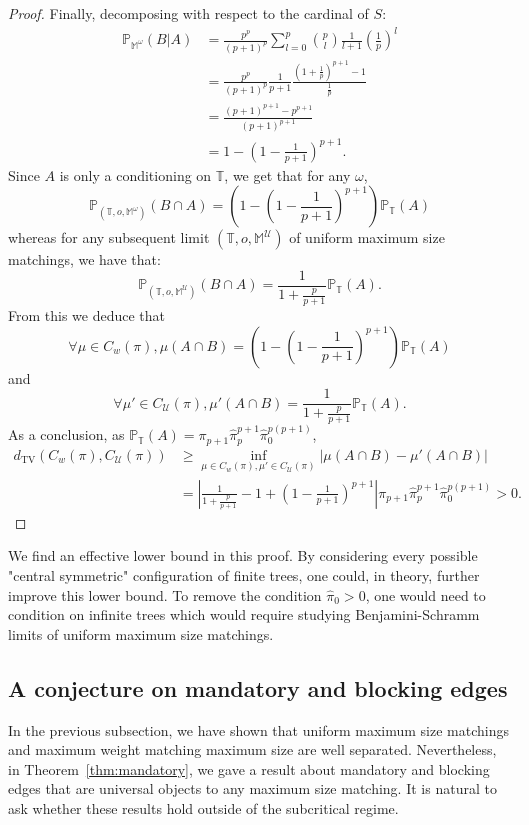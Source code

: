 \documentclass[11pt]{article}
\begin{document}
\begin{proof}
    Finally, decomposing with respect to the cardinal of $S$:
    \begin{align*}
        \mathbb{P}_{\mathbb{M}^{\omega}}(B|A)&= \frac{p^{p}}{(p+1)^{p}}  \sum_{l=0}^{p}  \binom{p}{l}  \frac{1}{l+1} \left(\frac{1}{p}\right)^{l} \\
        &= \frac{p^{p}}{(p+1)^{p}} \frac{1}{p+1}  \frac{(1+\frac{1}{p})^{p+1}-1}{\frac{1}{p}} \\
        &= \frac{(p+1)^{p+1}-p^{p+1}}{(p+1)^{p+1}} \\
        &= 1- \left(1-\frac{1}{p+1}\right)^{p+1}.
    \end{align*}
    Since $A$ is only a conditioning on $\mathbb{T}$, we get that for any $\omega$, \[ \mathbb{P}_{(\mathbb{T},o,\mathbb{M}^{\omega})}(B \cap A) = \left(1- \left(1-\frac{1}{p+1}\right)^{p+1}\right)\mathbb{P}_{\mathbb{T}}(A)\]
    whereas for any subsequent limit $(\mathbb{T},o,\mathbb{M}^{\mathcal{U}})$ of uniform maximum size matchings, we have that:
    \[ \mathbb{P}_{(\mathbb{T},o,\mathbb{M}^{\mathcal{U}})}(B \cap A)=\frac{1}{1+\frac{p}{p+1}}\mathbb{P}_{\mathbb{T}}(A).\]
    From this we deduce that \[ \forall \mu \in C_{w}(\pi), \mu(A\cap B)=\left( 1- \left(1-\frac{1}{p+1}\right)^{p+1}\right)  \mathbb{P}_{\mathbb{T}}(A) \]
    and
    \[ \forall \mu' \in C_{\mathcal{U}}(\pi), \mu'(A\cap B)= \frac{1}{1+\frac{p}{p+1}}\mathbb{P}_{\mathbb{T}}(A).\]
    As a conclusion, as $\mathbb{P}_{\mathbb{T}}(A)=\pi_{p+1}\hat{\pi}_p^{p+1}\hat{\pi}_0^{p(p+1)}$,
    \begin{align*}
        d_{\mathrm{TV}}(C_{w}(\pi),C_{\mathcal{U}}(\pi)) &\geq \inf_{\mu \in C_w(\pi),\mu'\in C_{\mathcal{U}}(\pi)} |\mu(A \cap B)-\mu'(A \cap B)| \\
        &=\left| \frac{1}{1+\frac{p}{p+1}}-1+ \left(1-\frac{1}{p+1}\right)^{p+1}\right| \pi_{p+1}\hat{\pi}_p^{p+1}\hat{\pi}_0^{p(p+1)} >0.
    \end{align*}
    \end{proof}
\begin{remark}
    We find an effective lower bound in this proof. By considering every possible "central symmetric" configuration of finite trees, one could, in theory, further improve this lower bound.
    To remove the condition $\hat{\pi}_0>0$, one would need to condition on infinite trees which would require studying Benjamini-Schramm limits of uniform maximum size matchings.
\end{remark}

\subsection{A conjecture on mandatory and blocking edges}
In the previous subsection, we have shown that uniform maximum size matchings and maximum weight matching maximum size are well separated. Nevertheless, in Theorem~\ref{thm:mandatory}, we gave a result about mandatory and blocking edges that are universal objects to any maximum size matching.
It is natural to ask whether these results hold outside of the subcritical regime.
\end{document}
